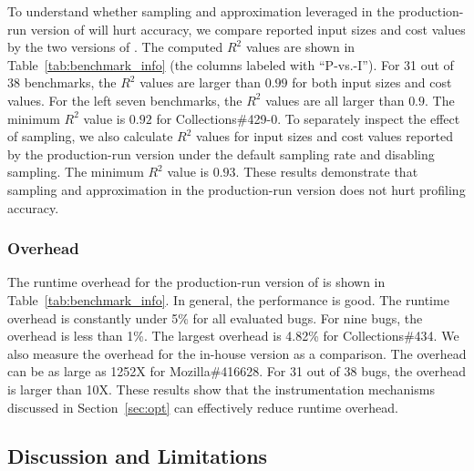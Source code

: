 
To understand whether sampling and approximation leveraged 
in the production-run version of \Tool will hurt accuracy, 
we compare reported input sizes and cost values by the two versions of \Tool.
The computed $R^2$ values are shown in Table~\ref{tab:benchmark_info} 
(the columns labeled with ``P-vs.-I''). 
For 31 out of 38 benchmarks, 
the $R^2$ values are larger than $0.99$ for both input sizes and cost values. 
For the left seven benchmarks, the $R^2$ values are all larger than $0.9$.
The minimum $R^2$ value is $0.92$ for Collections\#429-0. 
To separately inspect the effect of sampling, 
we also calculate $R^2$ values for input sizes and cost values reported 
by the production-run version under the default sampling rate and disabling sampling. 
The minimum $R^2$ value is $0.93$. 
These results demonstrate that sampling and approximation in the production-run 
version does not hurt profiling accuracy. 


\subsubsection{Overhead}
The runtime overhead for the production-run version of \Tool is 
shown in Table~\ref{tab:benchmark_info}. 
In general, the performance is good. The runtime overhead is constantly 
under 5\% for all evaluated bugs. 
For nine bugs, the overhead is less than 1\%. 
The largest overhead is 4.82\% for Collections\#434. 
We also measure the overhead for the in-house version as a comparison. 
The overhead can be as large as 1252X for Mozilla\#416628.
For 31 out of 38 bugs, the overhead is larger than 10X. 
These results show that the instrumentation mechanisms 
discussed in Section~\ref{sec:opt} can effectively reduce runtime overhead. 


\subsection{Discussion and Limitations}


